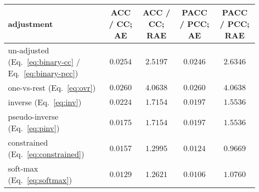 \begin{tabular}{lcccc}
  \toprule
    adjustment & ACC / CC; AE & ACC / CC; RAE & PACC / PCC; AE & PACC / PCC; RAE \\
  \midrule
    un-adjusted (Eq.~\ref{eq:binary-cc} / Eq.~\ref{eq:binary-pcc}) & ${0.0254}$ & ${2.5197}$ & ${0.0246}$ & ${2.6346}$ \\
    one-vs-rest (Eq.~\ref{eq:ovr}) & ${0.0260}$ & ${4.0638}$ & ${0.0260}$ & ${4.0638}$ \\
    inverse (Eq.~\ref{eq:inv}) & ${0.0224}$ & ${1.7154}$ & ${0.0197}$ & ${1.5536}$ \\
    pseudo-inverse (Eq.~\ref{eq:pinv}) & ${0.0175}$ & ${1.7154}$ & ${0.0197}$ & ${1.5536}$ \\
    constrained (Eq.~\ref{eq:constrained}) & ${0.0157}$ & ${1.2995}$ & ${0.0124}$ & $\mathbf{0.9669}$ \\
    soft-max (Eq.~\ref{eq:softmax}) & $\mathbf{0.0129}$ & $\mathbf{1.2621}$ & $\mathbf{0.0106}$ & ${1.0760}$ \\
  \bottomrule
\end{tabular}
